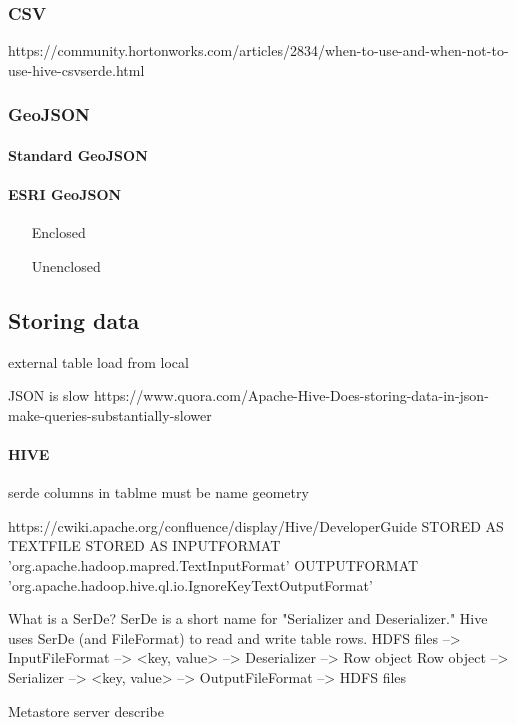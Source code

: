 \documentclass[a4paper,12pt,oneside]{report}
\begin{document}
		\subsubsection{CSV}
		
		https://community.hortonworks.com/articles/2834/when-to-use-and-when-not-to-use-hive-csvserde.html
		\subsubsection{GeoJSON}\label{json}	
			\paragraph{Standard GeoJSON}	
			\paragraph{ESRI GeoJSON}
				\begin{enumerate}
					\item[Enclosed]
					\item[Unenclosed]
				\end{enumerate}
	
	
	\subsection{Storing data}
	external table
	load from local

	 JSON is slow 
	https://www.quora.com/Apache-Hive-Does-storing-data-in-json-make-queries-substantially-slower
	
	\paragraph{HIVE}
		serde
	columns in tablme must be name geometry
	
	
	https://cwiki.apache.org/confluence/display/Hive/DeveloperGuide
	STORED AS TEXTFILE	
STORED AS INPUTFORMAT
  'org.apache.hadoop.mapred.TextInputFormat'
  OUTPUTFORMAT
  'org.apache.hadoop.hive.ql.io.IgnoreKeyTextOutputFormat'
	
	
	What is a SerDe?
SerDe is a short name for "Serializer and Deserializer."
Hive uses SerDe (and FileFormat) to read and write table rows.
HDFS files --> InputFileFormat --> <key, value> --> Deserializer --> Row object
Row object --> Serializer --> <key, value> --> OutputFileFormat --> HDFS files

	
	Metastore server describe
	
	
	
\end{document}
